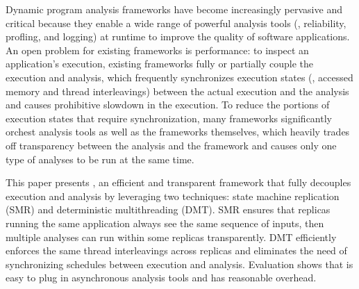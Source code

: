 
Dynamic program analysis frameworks have become increasingly pervasive and 
critical because they enable a wide range of powerful analysis tools (\eg, 
reliability, profling, and logging) at runtime to improve the quality of 
software applications. An open problem for existing frameworks is 
performance: to inspect an application's execution, existing frameworks 
fully or partially couple the execution and analysis, which frequently 
synchronizes execution states (\eg, accessed memory and thread interleavings) 
between the actual execution and the analysis and causes prohibitive slowdown 
in the execution. To reduce the portions of execution states that require 
synchronization, many frameworks significantly orchest analysis tools as well 
as the frameworks themselves, which heavily trades off transparency between the 
analysis and the framework and causes only one type of analyses to be run at 
the same time.


This paper presents \xxx, an efficient and transparent framework that fully 
decouples execution and analysis by leveraging two techniques: state machine 
replication (SMR) and deterministic multithreading (DMT). SMR ensures that 
replicas running the same application always see the same sequence of inputs, 
then multiple analyses can run within some replicas transparently. DMT 
efficiently enforces the same thread interleavings across replicas and 
eliminates the need of synchronizing schedules between execution and analysis. 
Evaluation shows that \xxx is easy to plug in asynchronous analysis tools and 
has reasonable overhead.